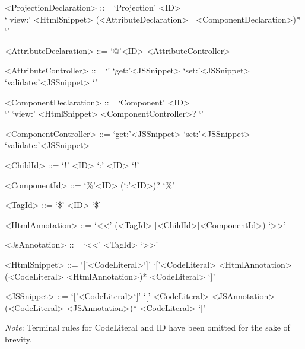 \documentclass{article}
\begin{document}
{\begin{grammar}
<ProjectionDeclaration> ::= `Projection' <ID> \\ `{ view:' <HtmlSnippet> (<AttributeDeclaration> | <ComponentDeclaration>)* `}'

<AttributeDeclaration> ::= `@'<ID> <AttributeController>

<AttributeController> ::= `{' `get:'<JSSnippet> `set:'<JSSnippet> `validate:'<JSSnippet> `}'

<ComponentDeclaration> ::= `Component' <ID> \\`{' `view:' <HtmlSnippet> <ComponentController>? `}'

<ComponentController> ::= `get:'<JSSnippet> `set:'<JSSnippet> `validate:'<JSSnippet> 
 
<ChildId> ::= `!' <ID> `:' <ID> `!'
 
<ComponentId> ::= `\%'<ID> (`:'<ID>)? `\%'

<TagId> ::= `\$' <ID> `\$' 

<HtmlAnnotation> ::= `<<' (<TagId> |<ChildId>|<ComponentId>) `>>'

<JsAnnotation> ::= `<<' <TagId> `>>'

<HtmlSnippet> ::= `['<CodeLiteral>`]'
\alt `['<CodeLiteral> <HtmlAnnotation> (<CodeLiteral> <HtmlAnnotation>)*  <CodeLiteral> `]'

<JSSnippet> ::= `['<CodeLiteral>`]'
\alt `[' <CodeLiteral> <JSAnnotation> (<CodeLiteral> <JSAnnotation>)*  <CodeLiteral> `]'


\end{grammar}

\emph{Note}: Terminal rules for CodeLiteral and ID have been omitted for the sake of brevity.

}
\end{document}
